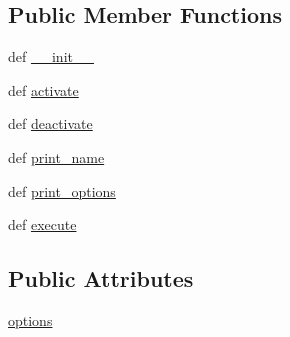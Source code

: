 \subsection*{Public Member Functions}
\begin{DoxyCompactItemize}
\item 
def \hyperlink{class_check_profile_1_1_check_profile_a59610ed60307ee5ae57651f34bf9529f}{\-\_\-\-\_\-init\-\_\-\-\_\-}
\item 
def \hyperlink{class_check_profile_1_1_check_profile_a24038337f9ee0ed6741e38121fefc8c8}{activate}
\item 
def \hyperlink{class_check_profile_1_1_check_profile_ae499aa8259bdb20f403cb1bf84909939}{deactivate}
\item 
def \hyperlink{class_check_profile_1_1_check_profile_a7b456afd6026cac14021c21c5ad850f3}{print\-\_\-name}
\item 
def \hyperlink{class_check_profile_1_1_check_profile_aee55aa9f7021cb65097a5a485985df7c}{print\-\_\-options}
\item 
def \hyperlink{class_check_profile_1_1_check_profile_ad3ef683b23f6127a7a31373d00a7f1dc}{execute}
\end{DoxyCompactItemize}
\subsection*{Public Attributes}
\begin{DoxyCompactItemize}
\item 
\hyperlink{class_check_profile_1_1_check_profile_a60bdbb946d15fb43c2e465bb8a3fff99}{options}
\end{DoxyCompactItemize}
